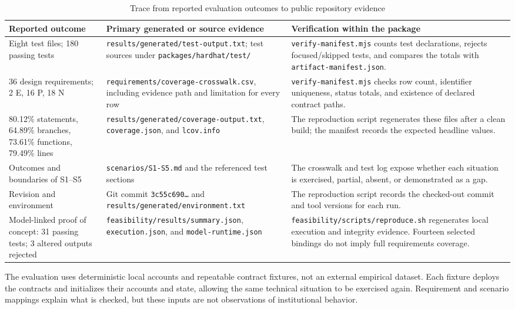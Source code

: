 \documentclass[journal]{IEEEtran}
\begin{document}
\begin{table}[t]
\centering
\caption{Trace from reported evaluation outcomes to public repository evidence}
\label{tab:evidence_ledger}
\renewcommand{\arraystretch}{1.08}
\footnotesize
\setlength{\tabcolsep}{3pt}
\begin{tabular}{@{}p{4.0cm}p{7.0cm}p{6.2cm}@{}}
\toprule
\textbf{Reported outcome} & \textbf{Primary generated or source evidence} & \textbf{Verification within the package} \\
\midrule
Eight test files; 180 passing tests & \texttt{results/generated/test-output.txt}; test sources under \texttt{packages/hardhat/test/} & \texttt{verify-manifest.mjs} counts test declarations, rejects focused/skipped tests, and compares the totals with \texttt{artifact-manifest.json}. \\
36 design requirements; 2 E, 16 P, 18 N & \texttt{requirements/coverage-crosswalk.csv}, including evidence path and limitation for every row & \texttt{verify-manifest.mjs} checks row count, identifier uniqueness, status totals, and existence of declared contract paths. \\
80.12\% statements, 64.89\% branches, 73.61\% functions, 79.49\% lines & \texttt{results/generated/coverage-output.txt}, \texttt{coverage.json}, and \texttt{lcov.info} & The reproduction script regenerates these files after a clean build; the manifest records the expected headline values. \\
Outcomes and boundaries of S1--S5 & \texttt{scenarios/S1-S5.md} and the referenced test sections & The crosswalk and test log expose whether each situation is exercised, partial, absent, or demonstrated as a gap. \\
Revision and environment & Git commit \texttt{3c55c690\ldots} and \texttt{results/generated/environment.txt} & The reproduction script records the checked-out commit and tool versions for each run. \\
Model-linked proof of concept: 31 passing tests; 3 altered outputs rejected &
\texttt{feasibility/results/summary.json}, \texttt{execution.json}, and
\texttt{model-runtime.json} &
\texttt{feasibility/scripts/reproduce.sh} regenerates local execution and
integrity evidence. Fourteen selected bindings do not imply full requirements coverage. \\
\bottomrule
\end{tabular}
\end{table}

The evaluation uses deterministic local accounts and repeatable contract
fixtures, not an external empirical dataset. Each fixture deploys the
contracts and initializes their accounts and state, allowing the same
technical situation to be exercised again. Requirement and scenario mappings
explain what is checked, but these inputs are not observations of
institutional behavior.
\end{document}

